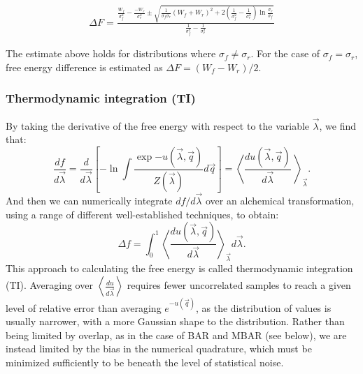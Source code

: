 \documentclass[9pt,bestpractices]{livecoms}
\newcommand{\expect}[1]{\left\langle{#1}\right\rangle}
\begin{document}
\begin{eqnarray}
 \Delta F = \frac{\frac{W_f}{\sigma_f^2}-\frac{-W_r}{\sigma_r^2}\pm\sqrt{\frac{1}{\sigma_f\sigma_r}(W_f+W_r)^2+2(\frac{1}{\sigma_f^2}-\frac{1}{\sigma_r^2})\ln{\frac{\sigma_r}{\sigma_f}}}}{\frac{1}{\sigma_f^2}-\frac{1}{\sigma_r^2}}
\end{eqnarray}\label{eq:cgi_noneq}

The estimate above holds for distributions where $\sigma_f \neq \sigma_r$.
For the case of $\sigma_f=\sigma_r$, free energy difference is estimated as $\Delta F = (W_f-W_r)/2$.

\subsubsection{Thermodynamic integration (TI)}
By taking the derivative of the free energy with respect to the
variable $\vec{\lambda}$, we find that:
\begin{equation}
\frac{df}{d\vec{\lambda}} = \frac{d}{d\vec{\lambda}} \left[-\ln \int \frac{\exp{-u(\vec{\lambda},\vec{q})}}{Z(\vec{\lambda})} d\vec{q}\right] = \expect{\frac{du(\vec{\lambda},\vec{q})}{d\vec{\lambda}}\
}_{\vec{\lambda}} .
\end{equation}
And then we can numerically integrate $df/d\vec{\lambda}$ over an alchemical transformation, using a range of different well-established techniques, to obtain:
\begin{equation}
\Delta f    = \int_{0}^{1} \expect{\frac{du(\vec{\lambda},\vec{q})}{d\vec{\lambda}}}_{\vec{\lambda}}  d\vec{\lambda}.    
\end{equation}
This approach to calculating the free energy is called thermodynamic integration (TI). Averaging over $\expect{\frac{du}{d\vec{\lambda}}}$ requires fewer uncorrelated samples to reach a given level of relative error
than averaging $e^{-u(\vec{q})}$, as the distribution of values is usually narrower, with a more Gaussian shape to the distribution. Rather than being limited by overlap, as in the case of BAR and MBAR (see below), we are instead limited by the bias in the numerical quadrature, which must be minimized sufficiently to be beneath the level of statistical noise.
\end{document}
